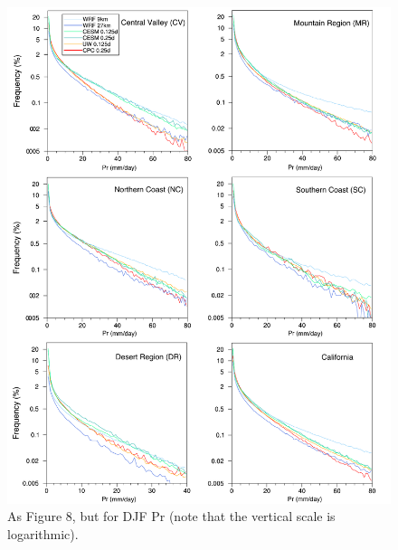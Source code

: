 \documentclass[draft,ms]{agutex}   %
\begin{document}
\begin{figure}
\begin{center}
\includegraphics[width=6in]{PDF_pr_allzones_DJF.pdf}
\end{center}
\caption{As Figure 8, but for DJF Pr (note that the vertical scale is logarithmic).} \label{fig:Figure 13}
\end{figure}
\end{document}
